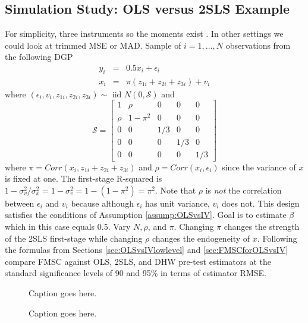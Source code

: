 \subsection{Simulation Study: OLS versus 2SLS Example}
\label{sec:OLSvsIVsim}
For simplicity, three instruments so the moments exist \citep{Phillips1980}. 
In other settings we could look at trimmed MSE or MAD.
Sample of $i = 1, \hdots, N$ observations from the following DGP 
\begin{eqnarray}
	y_i &=& 0.5 x_i + \epsilon_i\\
	x_i &=& \pi(z_{1i} + z_{2i} + z_{3i}) + v_i
\end{eqnarray}
where $(\epsilon_i, v_i, z_{1i}, z_{2i}, z_{3i}) \sim \mbox{ iid } N(0, \mathcal{S})$ and
\begin{equation}
	\mathcal{S} = \left[ \begin{array}
		{ccccc} 
		1 & \rho & 0 & 0 & 0\\
		\rho & 1 - \pi^2 & 0 & 0 & 0\\
		0 & 0 & 1/3 & 0 & 0\\
		0 & 0 & 0 & 1/3 & 0 \\
		0 & 0 & 0 & 0 & 1/3
	\end{array}\right]
\end{equation}
where $\pi = Corr(x_i, z_{1i} + z_{2i} + z_{3i})$ and $\rho = Corr(x_i,\epsilon_i)$ since the variance of $x$ is fixed at one.
The first-stage R-squared is $1 - \sigma_v^2/\sigma_x^2 = 1 - \sigma_v^2 = 1 - (1 - \pi^2) = \pi^2$.
Note that $\rho$ is \emph{not} the correlation between $\epsilon_i$ and $v_i$ because although $\epsilon_i$ has unit variance, $v_i$ does not.
This design satisfies the conditions of Assumption \ref{assump:OLSvsIV}.
Goal is to estimate $\beta$ which in this case equals 0.5.
Vary $N, \rho$, and $\pi$.
Changing $\pi$ changes the strength of the 2SLS first-stage while changing $\rho$ changes the endogeneity of $x$.
Following the formulas from Sections \ref{sec:OLSvsIVlowlevel} and \ref{sec:FMSCforOLSvsIV} compare FMSC against OLS, 2SLS, and DHW pre-test estimators at the standard significance levels of 90 and 95\% in terms of estimator RMSE.



\begin{figure}
\centering
	
	\caption{Caption goes here.}
\end{figure}



\begin{figure}
\centering
	
	\caption{Caption goes here.}
\end{figure}
